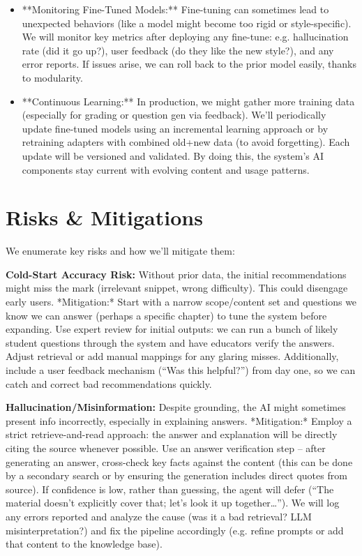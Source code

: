 \documentclass[11pt]{article}
\begin{document}
\begin{itemize}
  \item **Monitoring Fine-Tuned Models:** Fine-tuning can sometimes lead to unexpected behaviors (like a model might become too rigid or style-specific). We will monitor key metrics after deploying any fine-tune: e.g. hallucination rate (did it go up?), user feedback (do they like the new style?), and any error reports. If issues arise, we can roll back to the prior model easily, thanks to modularity.
  \item **Continuous Learning:** In production, we might gather more training data (especially for grading or question gen via feedback). We’ll periodically update fine-tuned models using an incremental learning approach or by retraining adapters with combined old+new data (to avoid forgetting). Each update will be versioned and validated. By doing this, the system’s AI components stay current with evolving content and usage patterns.
\end{itemize}

\section{Risks \& Mitigations}
We enumerate key risks and how we’ll mitigate them:

\textbf{Cold-Start Accuracy Risk:} Without prior data, the initial recommendations might miss the mark (irrelevant snippet, wrong difficulty). This could disengage early users. *Mitigation:* Start with a narrow scope/content set and questions we know we can answer (perhaps a specific chapter) to tune the system before expanding. Use expert review for initial outputs: we can run a bunch of likely student questions through the system and have educators verify the answers. Adjust retrieval or add manual mappings for any glaring misses. Additionally, include a user feedback mechanism (“Was this helpful?”) from day one, so we can catch and correct bad recommendations quickly.

\textbf{Hallucination/Misinformation:} Despite grounding, the AI might sometimes present info incorrectly, especially in explaining answers. *Mitigation:* Employ a strict retrieve-and-read approach: the answer and explanation will be directly citing the source whenever possible. Use an answer verification step – after generating an answer, cross-check key facts against the content (this can be done by a secondary search or by ensuring the generation includes direct quotes from source). If confidence is low, rather than guessing, the agent will defer (“The material doesn’t explicitly cover that; let’s look it up together…”). We will log any errors reported and analyze the cause (was it a bad retrieval? LLM misinterpretation?) and fix the pipeline accordingly (e.g. refine prompts or add that content to the knowledge base).
\end{document}
